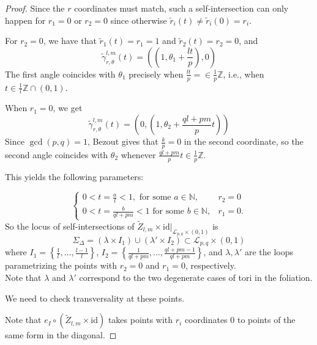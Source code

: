 \documentclass[reqno]{amsart}
\theoremstyle{definition}
\theoremstyle{remark}
\newcommand{\id}{{\mathrm{id}}}
\begin{document}
\begin{proof}
    Since the $r$ coordinates must match, such a self-intersection can
    only happen for $ r_1 = 0$
    or $r_2 = 0$ since otherwise
    $\tilde{r}_i(t) \neq \tilde{r}_i(0) = r_i$.

    For $r_2 = 0$, we have that
    $\tilde{r}_1(t) = r_1 = 1$ and
    $\tilde{r}_2 (t) = r_2 = 0$, and
    \[
    \tilde{\gamma}_{r, \theta}^{l,m} (t) = 
    \left( \left( 1, \theta_1 + \frac{lt}{p} \right) , 0 \right) 
    \] 
    The first angle coincides with
    $\theta_1$ precisely when
    $\frac{lt}{p} = \in \frac{1}{p}\mathbb{Z}$, i.e., when
    $t \in \frac{1}{l} \mathbb{Z} \cap (0,1)$.

    When $r_1 = 0$, we get
    \[
    \tilde{\gamma}_{r, \theta}^{l,m}(t) = 
    \left( 0, \left( 1, \theta_2 + \frac{ql+pm}{p}t \right)  \right) 
    \] 
    Since $\gcd (p,q) = 1$, Bezout gives that
    $ \frac{k}{p} = 0$ in the second coordinate, so 
     the second angle coincides with $\theta_2$ whenever
     $\frac{ql+pm}{p}t \in \frac{1}{p} \mathbb{Z}$.

     This yields the following parameters:

     \[
     \begin{cases}
         0 < t = \frac{a}{l} < 1, \text{ for some } a \in \mathbb{N} ,& 
         r_2 = 0\\
         0 < t = \frac{b}{ql+pm} < 1 \text{ for some } b \in \mathbb{N} ,&
         r_1 = 0.
     \end{cases}
     \] 
     So the locus of self-intersections of 
     $\tilde{Z}_{l,m} \times \id|_{\mathcal{L}_{p,q} \times (0,1)}$ is
     \[
     \Sigma_{\Delta} = 
     \left( \lambda \times I_1 \right) \cup 
     \left( \lambda'\times I_2 \right) \subset \mathcal{L}_{p,q} \times 
     (0,1)
     \] 
     where $I_1 = \left\{ \frac{1}{l}, \ldots,
     \frac{l-1}{l}\right\} $, 
     $I_2 = \left\{ \frac{1}{ql+pm}, \ldots, \frac{ql+pm-1}{ql+pm} \right\} $,
     and $\lambda, \lambda'$ are the loops parametrizing the
     points with $r_2 = 0$ and $r_1 = 0$, respectively.\\
     Note that $\lambda$ and $\lambda'$ correspond to the
     two degenerate cases of tori in the foliation.

     We need to check transversality at these points.

     Note that $e_I \circ \left( \tilde{Z}_{l,m} \times \id \right) $ takes
     points with $r_i$ coordinates $0$ to points of the same form
     in the diagonal.








\end{proof}
\end{document}
